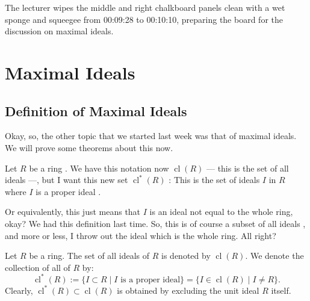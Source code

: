 \begin{note}
The lecturer wipes the middle and right chalkboard panels clean with a wet sponge and squeegee from 00:09:28 to 00:10:10, preparing the board for the discussion on maximal ideals.
\end{note}

\section{Maximal Ideals}

\subsection{Definition of Maximal Ideals}

\begin{speech}[00:10:11 - 00:11:04]
Okay, so, the other topic that we started last week was that of maximal ideals. We will prove some theorems about this now.

Let $R$ be a ring . We have this notation now $\operatorname{cl}(R)$ --- this is the set of all ideals ---, but I want this new set $\operatorname{cl}^*(R)$ : This is the set of ideals $I$ in $R$ where $I$ is a proper ideal .

Or equivalently, this just means that $I$ is an ideal not equal to the whole ring, okay?  We had this definition last time. So, this is of course a subset of all ideals , and more or less, I throw out the ideal which is the whole ring. All right?
\end{speech}

\begin{content}
Let $R$ be a ring. The set of all ideals of $R$ is denoted by $\operatorname{cl}(R)$. We denote the collection of all  of $R$ by:
\begin{equation}\label{eq:proper-ideals-def}
\operatorname{cl}^*(R) := \{ I \subset R \mid I \text{ is a proper ideal} \} = \{ I \in \operatorname{cl}(R) \mid I \neq R \}.
\end{equation}
Clearly, $\operatorname{cl}^*(R) \subset \operatorname{cl}(R)$ is obtained by excluding the unit ideal $R$ itself.
\end{content}

